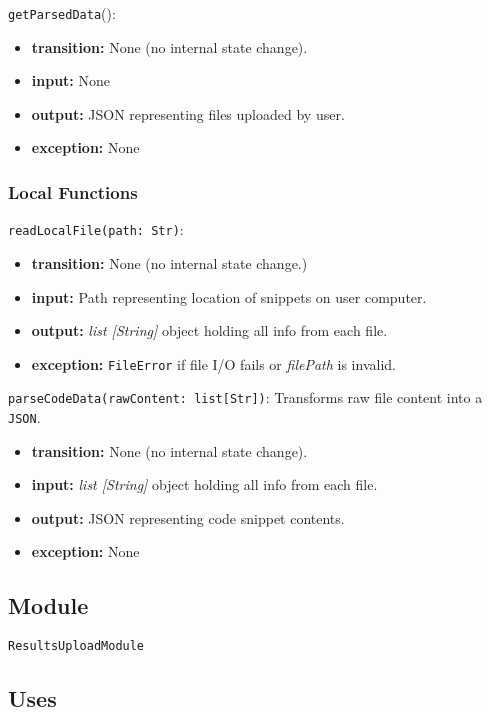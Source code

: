 \documentclass[12pt, titlepage]{article}
\begin{document}
\noindent \texttt{getParsedData}():
\begin{itemize}
    \item \textbf{transition:} None (no internal state change).
    \item \textbf{input:} None
    \item \textbf{output:} JSON representing files uploaded by user.
    \item \textbf{exception:} None
\end{itemize}

\subsubsection{Local Functions}

\noindent \texttt{readLocalFile(path: Str)}: 
\begin{itemize}
    \item \textbf{transition:} None (no internal state change.)
    \item \textbf{input:} Path representing location of snippets on user computer.
    \item \textbf{output:} \textit{list [String]} object holding all info from each
    file.
    \item \textbf{exception:} \texttt{FileError} if file I/O fails or \textit{filePath} is invalid.
\end{itemize}

\noindent \texttt{parseCodeData(rawContent: list[Str])}: Transforms raw file content into a \texttt{JSON}.
\begin{itemize}
    \item \textbf{transition:} None (no internal state change).
    \item \textbf{input:}  \textit{list [String]} object holding all info from each
    file.
    \item \textbf{output:} JSON representing code snippet contents.
    \item \textbf{exception:} None
\end{itemize}

\subsection{Module} %

\texttt{ResultsUploadModule}

\subsection{Uses}
\end{document}
